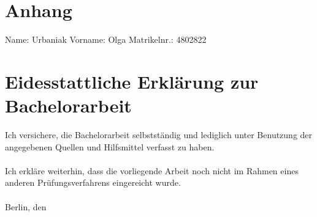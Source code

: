 \section{Anhang}
\vspace{6cm}
Name: Urbaniak \hfill Vorname: Olga \hfill Matrikelnr.: 4802822
\section*{Eidesstattliche Erklärung zur Bachelorarbeit}
Ich versichere, die Bachelorarbeit selbstständig und lediglich unter Benutzung der angegebenen Quellen und Hilfsmittel verfasst zu haben.
\\\\
Ich erkläre weiterhin, dass die vorliegende Arbeit noch nicht im Rahmen eines anderen Prüfungsverfahrens eingereicht wurde.
\\\\
Berlin, den \thesisDate
\clearpage
\pagestyle{fancy}
\fancyhf{} %
